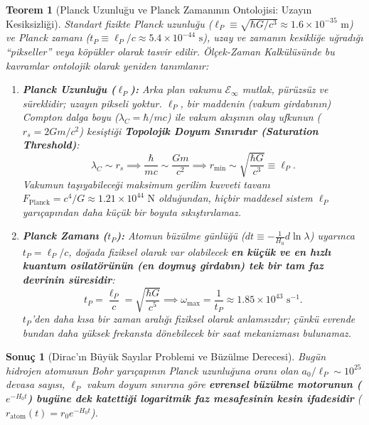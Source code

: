 \documentclass[11pt,a4paper]{article}
\newtheorem{theorem}{Teorem}[section]
\newtheorem{corollary}{Sonuç}[theorem]
\begin{document}
\begin{theorem}[Planck Uzunluğu ve Planck Zamanının Ontolojisi: Uzayın Kesiksizliği]
    \label{thm:planck_ontolojisi}
    Standart fizikte Planck uzunluğu ($\ell_P \equiv \sqrt{\hbar G/c^3} \approx 1.6 \times 10^{-35}\text{ m}$) ve Planck zamanı ($t_P \equiv \ell_P/c \approx 5.4 \times 10^{-44}\text{ s}$), uzay ve zamanın kesikliğe uğradığı ``pikseller'' veya köpükler olarak tasvir edilir. Ölçek-Zaman Kalkülüsünde bu kavramlar ontolojik olarak yeniden tanımlanır:
    \begin{enumerate}
        \item \textbf{Planck Uzunluğu ($\ell_P$):} Arka plan vakumu $\mathcal{E}_\infty$ mutlak, pürüzsüz ve süreklidir; uzayın pikseli yoktur. $\ell_P$, bir maddenin (vakum girdabının) Compton dalga boyu ($\lambda_C = \hbar/mc$) ile vakum akışının olay ufkunun ($r_s = 2Gm/c^2$) kesiştiği \textbf{Topolojik Doyum Sınırıdır (Saturation Threshold)}:
              \begin{equation}
                  \lambda_C \sim r_s \implies \frac{\hbar}{mc} \sim \frac{Gm}{c^2} \implies r_{\mathrm{min}} \sim \sqrt{\frac{\hbar G}{c^3}} \equiv \ell_P.
                  \label{eq:planck_uzunluk_sc}
              \end{equation}
              Vakumun taşıyabileceği maksimum gerilim kuvveti tavanı $F_{\mathrm{Planck}} = c^4/G \approx 1.21 \times 10^{44}\text{ N}$ olduğundan, hiçbir maddesel sistem $\ell_P$ yarıçapından daha küçük bir boyuta sıkıştırılamaz.
        \item \textbf{Planck Zamanı ($t_P$):} Atomun büzülme günlüğü ($dt \equiv -\frac{1}{H_0} d\ln\lambda$) uyarınca $t_P = \ell_P/c$, doğada fiziksel olarak var olabilecek \textbf{en küçük ve en hızlı kuantum osilatörünün (en doymuş girdabın) tek bir tam faz devrinin süresidir}:
              \begin{equation}
                  t_P = \frac{\ell_P}{c} = \sqrt{\frac{\hbar G}{c^5}} \implies \omega_{\mathrm{max}} = \frac{1}{t_P} \approx 1.85 \times 10^{43}\text{ s}^{-1}.
                  \label{eq:planck_zaman_sc}
              \end{equation}
              $t_P$'den daha kısa bir zaman aralığı fiziksel olarak anlamsızdır; çünkü evrende bundan daha yüksek frekansta dönebilecek bir saat mekanizması bulunamaz.
    \end{enumerate}
\end{theorem}

\begin{corollary}[Dirac'ın Büyük Sayılar Problemi ve Büzülme Derecesi]
    \label{cor:dirac_buyuk_sayilar_sc}
    Bugün hidrojen atomunun Bohr yarıçapının Planck uzunluğuna oranı olan $a_0 / \ell_P \sim 10^{25}$ devasa sayısı, $\ell_P$ vakum doyum sınırına göre \textbf{evrensel büzülme motorunun ($e^{-H_0 t}$) bugüne dek katettiği logaritmik faz mesafesinin kesin ifadesidir} ($r_{\mathrm{atom}}(t) = r_0 e^{-H_0 t}$).
\end{corollary}
\end{document}
